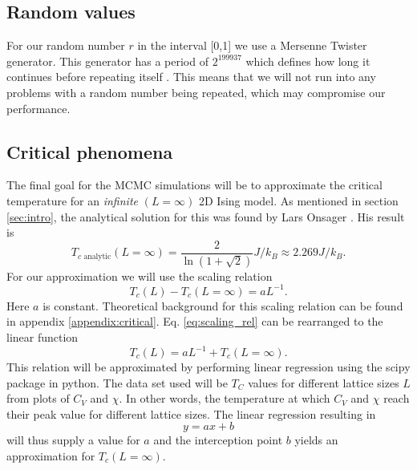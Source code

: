 \documentclass[english,notitlepage,reprint,nofootinbib]{revtex4-1}  %
\begin{document}
\subsection*{Random values}
For our random number $r$ in the interval [0,1] we use a Mersenne Twister generator. This generator has a period of $2^{199937}$ which defines how long it continues before repeating itself \cite{SHEMA201071}. This means that we will not run into any problems with a random number being repeated, which may compromise our performance.

\subsection*{Critical phenomena}
The final goal for the MCMC simulations will be to approximate the critical temperature for an \textit{infinite} $(L=\infty)$ 2D Ising model. As mentioned in section \ref{sec:intro}, the analytical solution for this was found by Lars Onsager \cite{project}. His result is
\begin{equation*}
    T_{c \text{ analytic}}(L=\infty) = \frac{2}{\ln(1+\sqrt{2})}J/k_B \approx 2.269 J/k_B.
\end{equation*}
For our approximation we will use the scaling relation
\begin{equation}
    T_c(L) -T_c(L=\infty) = aL^{-1}. \label{eq:scaling_rel}
\end{equation}
Here $a$ is constant. Theoretical background for this scaling relation can be found in appendix \ref{appendix:critical}. Eq. \ref{eq:scaling_rel} can be rearranged to the linear function
\begin{equation}
    T_c(L) = aL^{-1} + T_c(L=\infty). \label{eq:scaling_linear}
\end{equation}
This relation will be approximated by performing linear regression using the scipy package in python. The data set used will be $T_C$ values for different lattice sizes $L$ from plots of $C_V$ and $\chi$. In other words, the temperature at which $C_V$ and $\chi$ reach their peak value for different lattice sizes. The linear regression resulting in
\begin{equation}
    y = ax + b
\end{equation}
will thus supply a value for $a$ and the interception point $b$ yields an approximation for $T_c(L=\infty)$.
\end{document}
